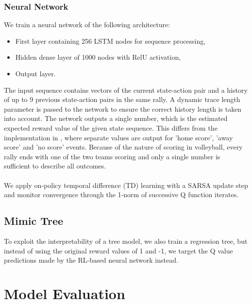 \documentclass{sfuthesis}
\begin{document}
	\subsection{Neural Network}

	We train a neural network of the following architecture:
	\begin{itemize}
		\item First layer containing 256 LSTM nodes for sequence processing,
		\item Hidden dense layer of 1000 nodes with RelU activation,
		\item Output layer.
	\end{itemize}
	The input sequence contains vectors of the current state-action pair and a history of up to 9 previous state-action pairs in the same rally. A dynamic trace length parameter is passed to the network to ensure the correct history length is taken into account. The network outputs a single number, which is the estimated expected reward value of the given state sequence. This differs from the implementation in \cite{liu2018deep}, where separate values are output for 'home score', 'away score' and 'no score' events. Because of the nature of scoring in volleyball, every rally ends with one of the two teams scoring and only a single number is sufficient to describe all outcomes.\\\\
	We apply on-policy temporal difference (TD) learning with a SARSA update step and monitor convergence through the 1-norm of successive Q function iterates.
	
	\section{Mimic Tree}
	
	To exploit the interpretability of a tree model, we also train a regression tree, but instead of using the original reward values of 1 and -1, we target the Q value predictions made by the RL-based neural network instead.
	
	\chapter{Model Evaluation}
	
\end{document}
